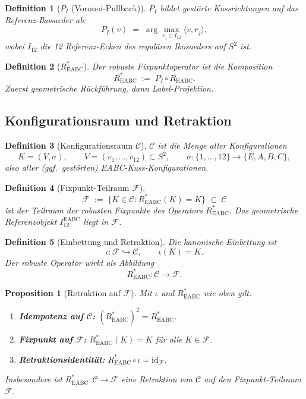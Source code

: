 \documentclass[11pt,a4paper]{article}
\newtheorem{definition}{Definition}
\newtheorem{proposition}{Proposition}
\begin{document}
	\begin{definition}[$P_I$ (Voronoi-Pullback)]
		$P_I$ bildet gestörte Kussrichtungen auf das Referenz-Ikosaeder ab:
		\[
		P_I(v) \;=\; \arg\max_{r_j\in I_{12}} \langle v, r_j\rangle,
		\]
		wobei $I_{12}$ die 12 Referenz-Ecken des regulären Ikosaeders auf $S^2$ ist.
	\end{definition}
	
	\begin{definition}[$R^*_{\mathrm{EABC}}$]
		Der robuste Fixpunktoperator ist die Komposition
		\[
		R^*_{\mathrm{EABC}} \;:=\; P_I \circ R_{\mathrm{EABC}}.
		\]
		Zuerst geometrische Rückführung, dann Label-Projektion.
	\end{definition}
	
	\subsection{Konfigurationsraum und Retraktion}
	
	\begin{definition}[Konfigurationsraum $\mathcal{C}$]
		$\mathcal{C}$ ist die Menge aller Konfigurationen
		\[
		K=(V,\sigma),
		\qquad
		V=(v_1,\ldots,v_{12})\subset S^2,
		\qquad
		\sigma\colon\{1,\ldots,12\}\to\{E,A,B,C\},
		\]
		also aller (ggf.\ gestörten) EABC-Kuss-Konfigurationen.
	\end{definition}
	
	\begin{definition}[Fixpunkt-Teilraum $\mathcal{F}$]
		\[
		\mathcal{F}
		\;:=\;
		\bigl\{K\in\mathcal{C} : R^*_{\mathrm{EABC}}(K)=K\bigr\}
		\;\subset\;
		\mathcal{C}
		\]
		ist der Teilraum der \emph{robusten Fixpunkte} des Operators $R^*_{\mathrm{EABC}}$.
		Das geometrische Referenzobjekt $I_{12}^{\mathrm{EABC}}$ liegt in $\mathcal{F}$.
	\end{definition}
	
	\begin{definition}[Einbettung und Retraktion]
		Die kanonische Einbettung ist
		\[
		\iota\colon \mathcal{F}\hookrightarrow \mathcal{C},\qquad \iota(K)=K.
		\]
		Der robuste Operator wirkt als Abbildung
		\[
		R^*_{\mathrm{EABC}}\colon \mathcal{C}\longrightarrow \mathcal{F}.
		\]
	\end{definition}
	
	\begin{proposition}[Retraktion auf $\mathcal{F}$]
		\label{prop:retraction}
		Mit $\iota$ und $R^*_{\mathrm{EABC}}$ wie oben gilt:
		\begin{enumerate}
			\item[(a)] \textbf{Idempotenz auf $\mathcal{C}$:}
			$(R^*_{\mathrm{EABC}})^2 = R^*_{\mathrm{EABC}}$.
			\item[(b)] \textbf{Fixpunkt auf $\mathcal{F}$:}
			$R^*_{\mathrm{EABC}}(K)=K$ für alle $K\in\mathcal{F}$.
			\item[(c)] \textbf{Retraktionsidentität:}
			$R^*_{\mathrm{EABC}}\circ \iota = \mathrm{id}_{\mathcal{F}}$.
		\end{enumerate}
		Insbesondere ist $R^*_{\mathrm{EABC}}\colon\mathcal{C}\to\mathcal{F}$ eine
		\emph{Retraktion} von $\mathcal{C}$ auf den Fixpunkt-Teilraum $\mathcal{F}$.
	\end{proposition}
	
\end{document}
